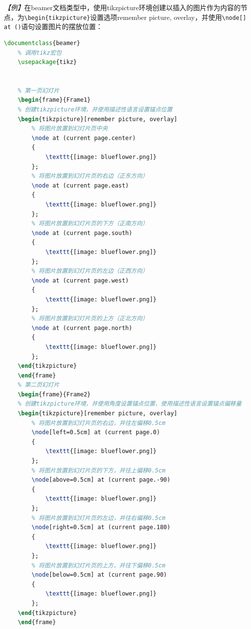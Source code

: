 \emph{【例】}在beamer文档类型中，使用tikzpicture环境创建以插入的图片作为内容的节点，为\texttt{\textbackslash{}begin\{tikzpicture\}}设置选项remember picture, overlay，并使用\texttt{\textbackslash{}node[] at ()}语句设置图片的摆放位置：
\begin{lstlisting}[language=TeX]
    \documentclass{beamer}
    % 调用tikz宏包
    \usepackage{tikz}

    
    % 第一页幻灯片
    \begin{frame}{Frame1}
    % 创建tikzpicture环境，并使用描述性语言设置锚点位置
    \begin{tikzpicture}[remember picture, overlay]
        % 将图片放置到幻灯片页中央
        \node at (current page.center) 
        {
            \texttt{[image: blueflower.png]}
        };
        % 将图片放置到幻灯片页的右边（正东方向）
        \node at (current page.east) 
        {
            \texttt{[image: blueflower.png]}
        };
        % 将图片放置到幻灯片页的下方（正南方向）
        \node at (current page.south) 
        {
            \texttt{[image: blueflower.png]}
        };
        % 将图片放置到幻灯片页的左边（正西方向）
        \node at (current page.west) 
        {
            \texttt{[image: blueflower.png]}
        };
        % 将图片放置到幻灯片页的上方（正北方向）
        \node at (current page.north) 
        {
            \texttt{[image: blueflower.png]}
        };
    \end{tikzpicture}
    \end{frame}
    % 第二页幻灯片
    \begin{frame}{Frame2}
    % 创建tikzpicture环境，并使用角度设置锚点位置、使用描述性语言设置锚点偏移量
    \begin{tikzpicture}[remember picture, overlay]
        % 将图片放置到幻灯片页的右边，并往左偏移0.5cm
        \node[left=0.5cm] at (current page.0) 
        {
            \texttt{[image: blueflower.png]}
        };
        % 将图片放置到幻灯片页的下方，并往上偏移0.5cm
        \node[above=0.5cm] at (current page.-90) 
        {
            \texttt{[image: blueflower.png]}
        };
        % 将图片放置到幻灯片页的左边，并往右偏移0.5cm
        \node[right=0.5cm] at (current page.180) 
        {
            \texttt{[image: blueflower.png]}
        };
        % 将图片放置到幻灯片页的上方，并往下偏移0.5cm
        \node[below=0.5cm] at (current page.90) 
        {
            \texttt{[image: blueflower.png]}
        };
    \end{tikzpicture}
    \end{frame}

    
\end{lstlisting}

